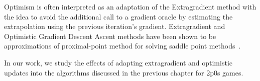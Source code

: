 Optimism is often interpreted as an adaptation of the Extragradient method with the idea to avoid
the additional call to a gradient oracle by estimating the extrapolation using the previous
iteration's gradient.
Extragradient and Optimistic Gradient Descent Ascent methods have been shown to be approximations
of proximal-point method for solving saddle point methods~\cite{mokhtariUnified2020}.

In our work, we study the effects of adapting extragradient and optimistic updates into the
algorithms discussed in the previous chapter for 2p0s games.

